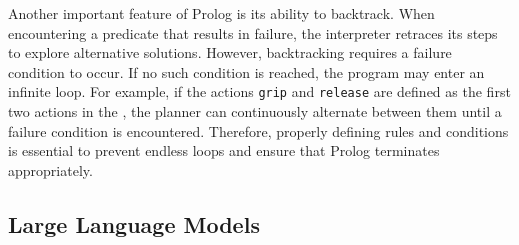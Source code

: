Another important feature of Prolog is its ability to backtrack. When encountering a predicate that results in failure, the interpreter retraces its steps to explore alternative solutions.
However, backtracking requires a failure condition to occur. If no such condition is reached, the program may enter an infinite loop. For example, if the actions \texttt{grip} and \texttt{release} are defined as the first two actions in the \kb, the planner can continuously alternate between them until a failure condition is encountered. Therefore, properly defining rules and conditions is essential to prevent endless loops and ensure that Prolog terminates appropriately.


\subsection{Large Language Models}

